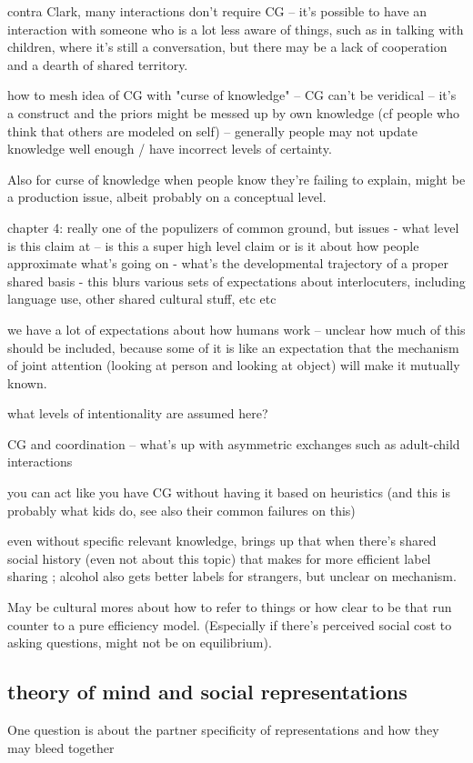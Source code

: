 \documentclass[]{article}
\begin{document}
\cite{clark1996} contra Clark, many interactions don't require CG -- it's possible to have an interaction with someone who is a lot less aware of things, such as in talking with children, where it's still a conversation, but there may be a lack of cooperation and a dearth of shared territory. 

how to mesh idea of CG with "curse of knowledge" -- CG can't be veridical -- it's a construct and the priors might be messed up by own knowledge (cf people who think that others are modeled on self) -- generally  people may not update knowledge well enough / have incorrect levels of certainty. 

Also for curse of knowledge when people know they're failing to explain, might be a production issue, albeit probably on a conceptual level. 

\cite{clark1996} chapter 4: really one of the populizers of common ground, but issues
- what level is this claim at -- is this a super high level claim or is it about how people approximate what's going on
- what's the developmental trajectory of a proper shared basis
- this blurs various sets of expectations about interlocuters, including language use, other shared cultural stuff, etc etc

we have a lot of expectations about how humans work -- unclear how much of this should be included, because some of it is like an expectation that the mechanism of joint attention (looking at person and looking at object) will make it mutually known. 

what levels of intentionality are assumed here? 

CG and coordination -- what's up with asymmetric exchanges such as adult-child interactions 

you can act like you have CG without having it based on heuristics (and this is probably what kids do, see also their common failures on this) 

even without specific relevant knowledge, \cite{garrison2022} brings up that when there's shared social history (even not about this topic) that makes for more efficient label sharing ; alcohol also gets better labels for strangers, but unclear on mechanism. 

May be cultural mores about how to refer to things or how clear to be that run counter to a pure efficiency model. (Especially if there's perceived social cost to asking questions, might not be on equilibrium). 

\subsection{theory of mind and social representations}
One question is about the partner specificity of representations and how they may bleed together
\end{document}
